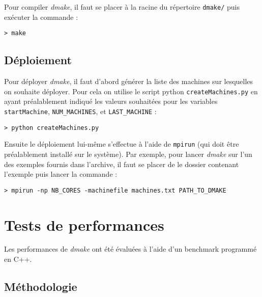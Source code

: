 \documentclass[a4paper,12pt,twoside]{article}
\begin{document}
Pour compiler \emph{dmake}, il faut se placer à la racine du
répertoire \texttt{dmake/} puis exécuter la commande :
\begin{verbatim}
> make
\end{verbatim}

\subsection{Déploiement}

Pour déployer \emph{dmake}, il faut d'abord générer la liste des
machines sur lesquelles on souhaite déployer. Pour cela on utilise le
script python \texttt{createMachines.py} en ayant préalablement indiqué
les valeurs souhaitées pour les variables \texttt{startMachine},
\texttt{NUM\_MACHINES}, et \texttt{LAST\_MACHINE} : 
\begin{verbatim}
> python createMachines.py
\end{verbatim}

Ensuite le déploiement lui-même s'effectue à l'aide de
\texttt{mpirun} (qui doit être préalablement installé sur le système). Par exemple, pour lancer \emph{dmake} sur l'un des
exemples fournis dans l'archive, il faut se placer de le dossier
contenant l'exemple puis lancer la commande :
\begin{verbatim}
> mpirun -np NB_CORES -machinefile machines.txt PATH_TO_DMAKE
\end{verbatim}



\section{Tests de performances}

Les performances de \emph{dmake} ont été évaluées à l'aide d'un
benchmark programmé en C++.

\subsection{Méthodologie}
\end{document}
